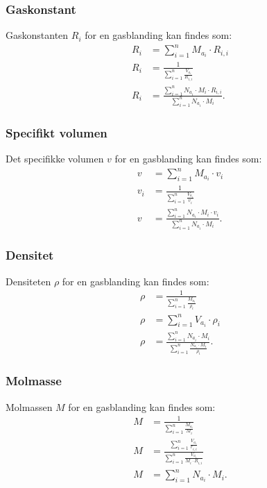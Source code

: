 \subsubsection{Gaskonstant}
Gaskonstanten $R_i$ for en gasblanding kan findes som:
\begin{align*}
  R_i &= \sum_{i = 1}^{n} M_{a_i}\cdot R_{i,i} \\
  R_{i} &= \frac{1}{\sum_{i = 1}^{n} \frac{V_{a_i}}{R_{i,i}}} \\
  R_{i} &= \frac{\sum_{i = 1}^{n} N_{a_i} \cdot M_i \cdot R_{i,i}}{\sum_{i = 1}^{n} N_{a_i} \cdot M_i}
.\end{align*}

\subsubsection{Specifikt volumen}
Det specifikke volumen $v$ for en gasblanding kan findes som:
\begin{align*}
  v &= \sum_{i = 1}^{n} M_{a_i}\cdot v_i \\
  v_i &= \frac{1}{\sum_{i = 1}^{n} \frac{V_{a_i}}{v_i}} \\
  v &= \frac{\sum_{i = 1}^{n} N_{a_i} \cdot M_i \cdot v_i}{\sum_{i = 1}^{n} N_{a_i} \cdot M_i}
.\end{align*}

\subsubsection{Densitet}
Densiteten $\rho$ for en gasblanding kan findes som:
\begin{align*}
  \rho &= \frac{1}{\sum_{i = 1}^{n} \frac{M_{a_i}}{\rho_i}} \\
  \rho &= \sum_{i = 1}^{n} V_{a_i}\cdot \rho_i \\
  \rho &= \frac{\sum_{i = 1}^{n} N_{a_i} \cdot M_i}{\sum_{i = 1}^{n} \frac{N_{a_i} \cdot M_i}{\rho_i}}
.\end{align*}

\subsubsection{Molmasse}
Molmassen $M$ for en gasblanding kan findes som:
\begin{align*}
  M &= \frac{1}{\sum_{i = 1}^{n} \frac{M_{a_i}}{M_i}} \\
  M &= \frac{\sum_{i = 1}^{n} \frac{V_{a_i}}{r_{i,i}}}{\sum_{i = 1}^{n} \frac{V_{a_i}}{M_i \cdot R_{i,i}}} \\
  M &= \sum_{i = 1}^{n} N_{a_i} \cdot M_i
.\end{align*}

